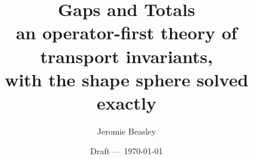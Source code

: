 \documentclass[11pt,a4paper]{article}
\title{\bfseries Gaps and Totals\\[2pt]
\large an operator-first theory of transport invariants,\\ with the shape sphere solved exactly}
\author{Jeromie Beasley}
\date{Draft --- \today}
\theoremstyle{definition}
\begin{document}
\maketitle

\begin{abstract}

\end{abstract}

\tableofcontents












\appendix


\end{document}

